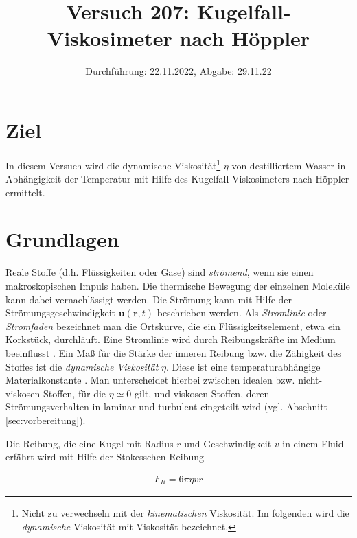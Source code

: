 

\title{Versuch 207: Kugelfall-Viskosimeter nach Höppler}
\date{Durchführung: 22.11.2022, Abgabe: 29.11.22}



\maketitle

\tableofcontents
\newpage



\section{Ziel}
In diesem Versuch wird die dynamische Viskosität\footnote{Nicht zu verwechseln mit der \textit{kinematischen} Viskosität.
Im folgenden wird die \textit{dynamische} Viskosität mit Viskosität bezeichnet.} $\eta$ 
von destilliertem Wasser in Abhängigkeit der Temperatur mit Hilfe des Kugelfall-Viskosimeters nach Höppler ermittelt.



\section{Grundlagen}
\label{sec:grundlagen}
Reale Stoffe (d.h. Flüssigkeiten oder Gase) sind \textit{strömend}, wenn sie einen makroskopischen Impuls haben.
Die thermische Bewegung der einzelnen Moleküle kann dabei vernachlässigt werden.
Die Strömung kann mit Hilfe der Strömungsgeschwindigkeit $\symbf{u}\left(\symbf{r},t\right)$ beschrieben werden.
Als \textit{Stromlinie} oder \textit{Stromfaden} bezeichnet man die Ortskurve, die ein Flüssigkeitselement, etwa ein Korkstück, durchläuft.
Eine Stromlinie wird durch Reibungskräfte im Medium beeinflusst \cite[]{demtroeder}.
Ein Maß für die Stärke der inneren Reibung bzw. die Zähigkeit des Stoffes ist die \textit{dynamische Viskosität} $\eta$.
Diese ist eine temperaturabhängige Materialkonstante \cite[]{geschke}.
Man unterscheidet hierbei zwischen idealen bzw. nicht-viskosen Stoffen, für die $\eta \simeq 0$ gilt, und viskosen Stoffen,
deren Strömungsverhalten in laminar und turbulent eingeteilt wird (vgl. Abschnitt \ref{sec:vorbereitung}).

Die Reibung, die eine Kugel mit Radius $r$ und Geschwindigkeit $v$ in einem Fluid erfährt wird mit Hilfe der Stokesschen Reibung 

\begin{align}
    F_R = 6 \pi \eta v r    
\end{align}

